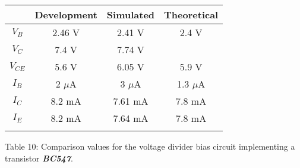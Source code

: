 \begin{center}
\begin{tabular}[1.5cm]{c c c c}
\toprule
\toprule
\centering \hspace{75pt} & \hspace{30pt} Development \hspace{30pt} & \hspace{30pt} Simulated \hspace{30pt} & \hspace{30pt} Theoretical \hspace{30pt} \\
\midrule
\midrule
$V_{B}$ & 2.46 V & 2.41 V & 2.4 V\\
\cmidrule{1-4}
$V_{C}$ & 7.4 V & 7.74 V & \\
\cmidrule{1-4}
$V_{CE}$ & 5.6 V & 6.05 V & 5.9 V \\
\cmidrule{1-4}
$I_{B}$ & 2 $\mu$A & 3 $\mu$A & 1.3 $\mu$A \\
\cmidrule{1-4}
$I_{C}$ & 8.2 mA & 7.61 mA & 7.8 mA \\
\cmidrule{1-4}
$I_{E}$ & 8.2 mA & 7.64 mA & 7.8 mA \\
\bottomrule
\linebreak
\end{tabular}
\linebreak Table 10: Comparison values for the voltage divider bias circuit implementing a transistor {\bfseries\itshape BC547}.
\end{center} \hfill

\pagebreak